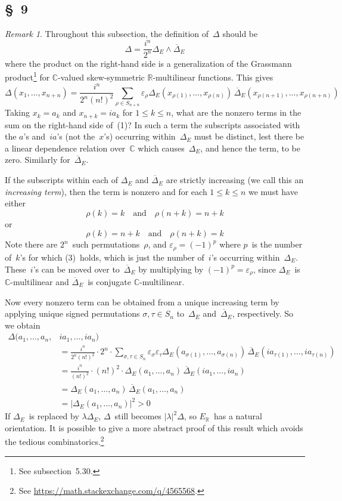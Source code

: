\documentclass[letterpaper,12pt]{article}
\newcommand{\R}{\mathbb{R}}
\newcommand{\C}{\mathbb{C}}
\newcommand{\mult}{\cdot}
\newcommand{\eprod}{\wedge}
\newcommand{\abs}[1]{|#1|}
\newcommand{\conj}[1]{\overline{#1}}
\newcommand{\sign}[1]{\varepsilon_{#1}}
\theoremstyle{definition}
\theoremstyle{remark}
\newtheorem*{rmk}{Remark}
\begin{document}
\subsection*{\S~9}
\begin{rmk}
Throughout this subsection, the definition of~\(\Delta\) should be
\[\Delta=\frac{i^n}{2^n}\Delta_E\eprod\conj{\Delta}_E\]
where the product on the right-hand side is a generalization of the Grassmann product\footnote{See subsection~5.30.} for \(\C\)-valued skew-symmetric \(\R\)-multilinear functions. This gives
\[\Delta(x_1,\ldots,x_{n+n})=\frac{i^n}{2^n(n!)^2}\sum_{\rho\in S_{n+n}}\sign{\rho}\Delta_E(x_{\rho(1)},\ldots,x_{\rho(n)})\,\conj{\Delta}_E(x_{\rho(n+1)},\ldots,x_{\rho(n+n)})\tag{1}\]
Taking \(x_k=a_k\) and \(x_{n+k}=ia_k\) for \(1\le k\le n\), what are the nonzero terms in the sum on the right-hand side of~(1)? In such a term the subscripts associated with the \(a\)'s and~\(ia\)'s (not the~\(x\)'s) occurring within~\(\Delta_E\) must be distinct, lest there be a linear dependence relation over~\(\C\) which causes~\(\Delta_E\), and hence the term, to be zero. Similarly for~\(\conj{\Delta}_E\).

If the subscripts within each of \(\Delta_E\) and \(\conj{\Delta}_E\) are strictly increasing (we call this an \emph{increasing term}), then the term is nonzero and for each \(1\le k\le n\) we must have either
\[\rho(k)=k\quad\text{and}\quad\rho(n+k)=n+k\tag{2}\]
or
\[\rho(k)=n+k\quad\text{and}\quad\rho(n+k)=k\tag{3}\]
Note there are \(2^n\)~such permutations~\(\rho\), and \(\sign{\rho}=(-1)^p\) where \(p\)~is the number of~\(k\)'s for which (3)~holds, which is just the number of~\(i\)'s occurring within~\(\Delta_E\). These~\(i\)'s can be moved over to~\(\conj{\Delta}_E\) by multiplying by \((-1)^p=\sign{\rho}\), since \(\Delta_E\)~is \(\C\)-multilinear and \(\conj{\Delta}_E\)~is conjugate \(\C\)-multilinear.

Now every nonzero term can be obtained from a unique increasing term by applying unique signed permutations \(\sigma,\tau\in S_n\) to~\(\Delta_E\) and~\(\conj{\Delta}_E\), respectively. So we obtain
\begin{align*}
\Delta(a_1,\ldots,a_n,&ia_1,\ldots,ia_n)\\
&=\frac{i^n}{2^n(n!)^2}\mult2^n\mult\sum_{\sigma,\tau\in S_n}\sign{\sigma}\sign{\tau}\Delta_E(a_{\sigma(1)},\ldots,a_{\sigma(n)})\,\conj{\Delta}_E(ia_{\tau(1)},\ldots,ia_{\tau(n)})\\
&=\frac{i^n}{(n!)^2}\mult(n!)^2\mult\Delta_E(a_1,\ldots,a_n)\,\conj{\Delta}_E(ia_1,\ldots,ia_n)\\
&=\Delta_E(a_1,\ldots,a_n)\,\conj{\Delta}_E(a_1,\ldots,a_n)\\
&=\abs{\Delta_E(a_1,\ldots,a_n)}^2>0
\end{align*}
If \(\Delta_E\)~is replaced by \(\lambda\Delta_E\), \(\Delta\)~still becomes \(\abs{\lambda}^2\Delta\), so \(E_{\R}\)~has a natural orientation. It is possible to give a more abstract proof of this result which avoids the tedious combinatorics.\footnote{See \url{https://math.stackexchange.com/q/4565568}.}
\end{rmk}
\end{document}
